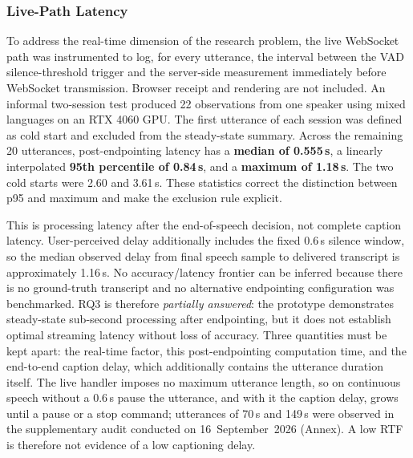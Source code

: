 \documentclass[12pt]{report}
\begin{document}
\subsubsection{Live-Path Latency}
To address the real-time dimension of the research problem, the live WebSocket path was instrumented to log, for every utterance, the interval between the VAD silence-threshold trigger and the server-side measurement immediately before WebSocket transmission. Browser receipt and rendering are not included. An informal two-session test produced 22 observations from one speaker using mixed languages on an RTX 4060 GPU. The first utterance of each session was defined as cold start and excluded from the steady-state summary. Across the remaining 20 utterances, post-endpointing latency has a \textbf{median of 0.555\,s}, a linearly interpolated \textbf{95th percentile of 0.84\,s}, and a \textbf{maximum of 1.18\,s}. The two cold starts were 2.60 and 3.61\,s. These statistics correct the distinction between p95 and maximum and make the exclusion rule explicit.

This is processing latency after the end-of-speech decision, not complete caption latency. User-perceived delay additionally includes the fixed 0.6\,s silence window, so the median observed delay from final speech sample to delivered transcript is approximately 1.16\,s. No accuracy/latency frontier can be inferred because there is no ground-truth transcript and no alternative endpointing configuration was benchmarked. RQ3 is therefore \emph{partially answered}: the prototype demonstrates steady-state sub-second processing after endpointing, but it does not establish optimal streaming latency without loss of accuracy. Three quantities must be kept apart: the real-time factor, this post-endpointing computation time, and the end-to-end caption delay, which additionally contains the utterance duration itself. The live handler imposes no maximum utterance length, so on continuous speech without a 0.6\,s pause the utterance, and with it the caption delay, grows until a pause or a stop command; utterances of 70\,s and 149\,s were observed in the supplementary audit conducted on 16~September~2026 (Annex). A low RTF is therefore not evidence of a low captioning delay.
\end{document}

